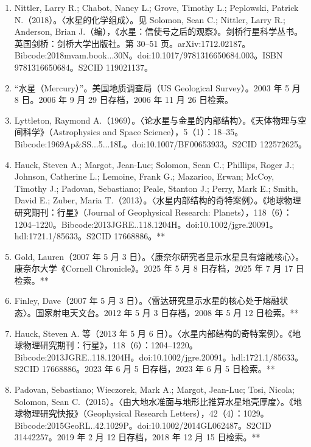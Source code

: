 \begin{enumerate}
    \item Nittler, Larry R.; Chabot, Nancy L.; Grove, Timothy L.; Peplowski, Patrick N.（2018）。〈水星的化学组成〉。见 Solomon, Sean C.; Nittler, Larry R.; Anderson, Brian J.（编），《水星：信使号之后的观察》。剑桥行星科学丛书。英国剑桥：剑桥大学出版社。第 30–51 页。arXiv:1712.02187。Bibcode:2018mvam.book...30N。doi:10.1017/9781316650684.003。ISBN 9781316650684。S2CID 119021137。
    \item “水星（Mercury）”。美国地质调查局（US Geological Survey）。2003 年 5 月 8 日。2006 年 9 月 29 日存档，2006 年 11 月 26 日检索。
    \item Lyttleton, Raymond A.（1969）。〈论水星与金星的内部结构〉。《天体物理与空间科学》（Astrophysics and Space Science），5（1）：18–35。Bibcode:1969Ap&SS...5...18L。doi:10.1007/BF00653933。S2CID 122572625。

    \item Hauck, Steven A.; Margot, Jean-Luc; Solomon, Sean C.; Phillips, Roger J.; Johnson, Catherine L.; Lemoine, Frank G.; Mazarico, Erwan; McCoy, Timothy J.; Padovan, Sebastiano; Peale, Stanton J.; Perry, Mark E.; Smith, David E.; Zuber, Maria T.（2013）。〈水星内部结构的奇特案例〉。《地球物理研究期刊：行星》（Journal of Geophysical Research: Planets），118（6）：1204–1220。Bibcode:2013JGRE..118.1204H。doi:10.1002/jgre.20091。hdl:1721.1/85633。S2CID 17668886。**

    \item Gold, Lauren（2007 年 5 月 3 日）。〈康奈尔研究者显示水星具有熔融核心〉。康奈尔大学《Cornell Chronicle》。2025 年 5 月 8 日存档，2025 年 7 月 17 日检索。**

    \item Finley, Dave（2007 年 5 月 3 日）。〈雷达研究显示水星的核心处于熔融状态〉。国家射电天文台。2012 年 5 月 3 日存档，2008 年 5 月 12 日检索。**

    \item Hauck, Steven A. 等（2013 年 5 月 6 日）。〈水星内部结构的奇特案例〉。《地球物理研究期刊：行星》，118（6）：1204–1220。Bibcode:2013JGRE..118.1204H。doi:10.1002/jgre.20091。hdl:1721.1/85633。S2CID 17668886。2023 年 6 月 5 日存档，2023 年 6 月 5 日检索。**

    \item Padovan, Sebastiano; Wieczorek, Mark A.; Margot, Jean-Luc; Tosi, Nicola; Solomon, Sean C.（2015）。〈由大地水准面与地形比推算水星地壳厚度〉。《地球物理研究快报》（Geophysical Research Letters），42（4）：1029。Bibcode:2015GeoRL..42.1029P。doi:10.1002/2014GL062487。S2CID 31442257。2019 年 2 月 12 日存档，2018 年 12 月 15 日检索。**


\end{enumerate}
